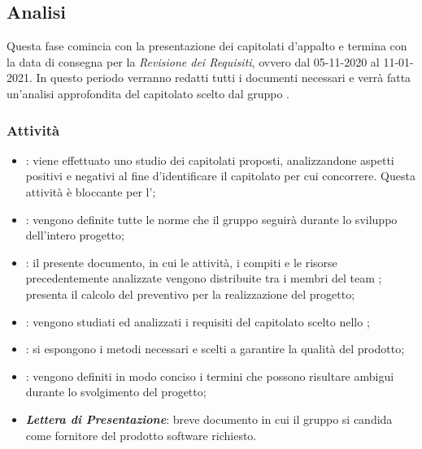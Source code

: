 \subsection{Analisi}
Questa fase comincia con la presentazione dei capitolati d'appalto e termina con la data di consegna per la \textit{Revisione dei Requisiti}, ovvero dal 05-11-2020 al 11-01-2021.
In questo periodo verranno redatti tutti i documenti necessari e verrà fatta un'analisi approfondita del capitolato scelto dal gruppo \Gruppo{}.
\subsubsection{Attività}
\begin{itemize}
\item \textbf{\SdF{}}: viene effettuato uno studio dei capitolati proposti, analizzandone aspetti positivi e negativi al fine d'identificare il capitolato per cui concorrere. Questa attività è bloccante per l'\textit{\AdR};
\item \textbf{\NdP{}}: vengono definite tutte le norme che il gruppo \Gruppo{} seguirà durante lo sviluppo dell'intero progetto;
\item \textbf{\PdP{}}: il presente documento, in cui le attività, i compiti\glo{} e le risorse precedentemente analizzate vengono distribuite tra i membri del team \Gruppo{}; presenta il calcolo del preventivo per la realizzazione del progetto;
\item \textbf{\AdR{}}: vengono studiati ed analizzati i requisiti del capitolato\glo{} scelto nello \SdF{};
\item \textbf{\PdQ{}}: si espongono i metodi necessari e scelti a garantire la qualità del prodotto;
\item \textbf{\Glossario{}}: vengono definiti in modo conciso i termini che possono risultare ambigui durante lo svolgimento del progetto;
\item \textbf{\textit{Lettera di Presentazione}}: breve documento in cui il gruppo \Gruppo{} si candida come fornitore del prodotto software richiesto.
\end{itemize}
